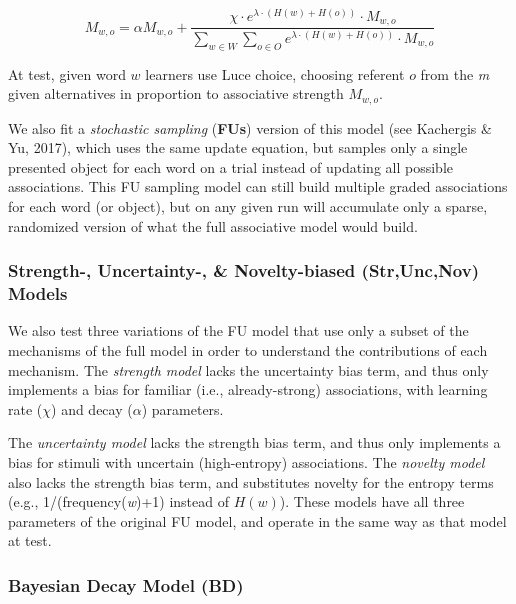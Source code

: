 \documentclass[10pt, letterpaper]{article}
\begin{document}
\begin{equation}
M_{w,o} =  \alpha M_{w,o} + \frac{ \chi \cdot e^{ \lambda \cdot (H(w) + H(o)) } \cdot M_{w,o}  }{  \sum_{w\in W} \sum_{o\in O} e^{ \lambda \cdot (H(w) + H(o)) } \cdot M_{w,o} }
\label{eq:fullmodel}
\end{equation}

At test, given word \(w\) learners use Luce choice, choosing referent
\(o\) from the \textit{m} given alternatives in proportion to
associative strength \(M_{w,o}\).

We also fit a \emph{stochastic sampling} (\textbf{FUs}) version of this
model (see Kachergis \& Yu, 2017), which uses the same update equation,
but samples only a single presented object for each word on a trial
instead of updating all possible associations. This FU sampling model
can still build multiple graded associations for each word (or object),
but on any given run will accumulate only a sparse, randomized version
of what the full associative model would build.

\hypertarget{strength--uncertainty--novelty-biased-struncnov-models}{%
\subsubsection{Strength-, Uncertainty-, \& Novelty-biased (Str,Unc,Nov)
Models}\label{strength--uncertainty--novelty-biased-struncnov-models}}

We also test three variations of the FU model that use only a subset of
the mechanisms of the full model in order to understand the
contributions of each mechanism. The \emph{strength model} lacks the
uncertainty bias term, and thus only implements a bias for familiar
(i.e., already-strong) associations, with learning rate (\(\chi\)) and
decay (\(\alpha\)) parameters.

The \emph{uncertainty model} lacks the strength bias term, and thus only
implements a bias for stimuli with uncertain (high-entropy)
associations. The \emph{novelty model} also lacks the strength bias
term, and substitutes novelty for the entropy terms (e.g.,
1/(frequency(\emph{w})+1) instead of \(H(w)\)). These models have all
three parameters of the original FU model, and operate in the same way
as that model at test.

\hypertarget{bayesian-decay-model-bd}{%
\subsubsection{Bayesian Decay Model
(BD)}\label{bayesian-decay-model-bd}}
\end{document}
